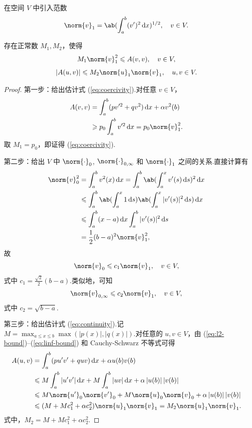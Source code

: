 在空间 $V$ 中引入范数
\begin{equation*}
\norm{v}_1 = \ab(\int_a^b (v')^2 \d x)^{1/2}, \quad v \in V.
\end{equation*}

\begin{lemma}
存在正常数 $M_1, M_2$，使得
\begin{equation}\label{eq:coercivity}
M_1 \norm{v}_1^2 \leq A(v,v), \quad v \in V,
\end{equation}
\begin{equation}\label{eq:continuity}
|A(u,v)| \leq M_2 \norm{u}_1 \norm{v}_1, \quad u, v \in V.
\end{equation}
\end{lemma}

\begin{proof}
第一步：给出估计式 (\ref{eq:coercivity}).对任意 $v \in V$，
\begin{align*}
A(v,v) &= \int_a^b (pv'^2 + qv^2)\d x + \alpha v^2(b) \\
&\geq p_0 \int_a^b v'^2 \d x = p_0 \norm{v}_1^2.
\end{align*}
取 $M_1 = p_0$，即证得 (\ref{eq:coercivity}).\par
第二步：给出 $V$ 中 $\norm{\cdot}_0$, $\norm{\cdot}_{0,\infty}$ 和 $\norm{\cdot}_1$
之间的关系.直接计算有
\begin{align*}
\norm{v}_0^2 &= \int_a^b v^2(x)\d x = \int_a^b \ab(\int_a^x v'(s)\d s)^2 \d x \\
&\leq \int_a^b \ab(\int_a^x 1\d s)\ab(\int_a^x |v'(s)|^2 \d s) \d x \\
&\leq \int_a^b (x-a)\d x \int_a^b |v'(s)|^2 \d s \\
&= \frac{1}{2}(b-a)^2 \norm{v}_1^2,
\end{align*}
故
\begin{equation}\label{eq:l2-bound}
\norm{v}_0 \leq c_1 \norm{v}_1, \quad v \in V,
\end{equation}
式中 $c_1 = \frac{\sqrt{2}}{2}(b-a)$.类似地，可知
\begin{equation}\label{eq:linf-bound}
\norm{v}_{0,\infty} \leq c_2 \norm{v}_1, \quad v \in V,
\end{equation}
式中 $c_2 = \sqrt{b-a}$.\par
第三步：给出估计式 (\ref{eq:continuity}).记 $M = \max_{a \leq x \leq b} \max(|p(x)|,
|q(x)|)$.对任意的 $u, v \in V$，由 (\ref{eq:l2-bound})--(\ref{eq:linf-bound}) 和 Cauchy-Schwarz
不等式可得
\begin{align*}
A(u,v) &= \int_a^b (pu'v' + quv)\d x + \alpha u(b)v(b) \\
&\leq M\int_a^b |u'v'|\d x + M\int_a^b |uv|\d x + \alpha\, |u(b)|\,|v(b)| \\
&\leq M\norm{u'}_0 \norm{v'}_0 + M\norm{u}_0 \norm{v}_0 + \alpha\, |u(b)|\,|v(b)| \\
&\leq (M + Mc_1^2 + \alpha c_2^2)\norm{u}_1\norm{v}_1 = M_2 \norm{u}_1\norm{v}_1.
\end{align*}
式中，$M_2 = M + Mc_1^2 + \alpha c_2^2$.
\end{proof}

